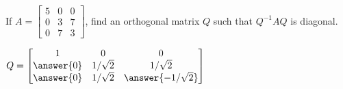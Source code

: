 \documentclass{ximera}
\author{}
\begin{document}
\begin{exercise}
If $A = \begin{bmatrix}
5 & 0 & 0 \\
0 & 3 & 7 \\
0 & 7 & 3
\end{bmatrix}$, find an orthogonal matrix $Q$ such that $Q^{-1}AQ$ is diagonal.

$Q = \begin{bmatrix}
1 & 0 & 0 \\
\answer{0} & 1/\sqrt{2} & 1/\sqrt{2} \\
\answer{0} & 1/\sqrt{2} & \answer{-1/\sqrt{2}}
\end{bmatrix}$

 \end{exercise}
 
\end{document}
